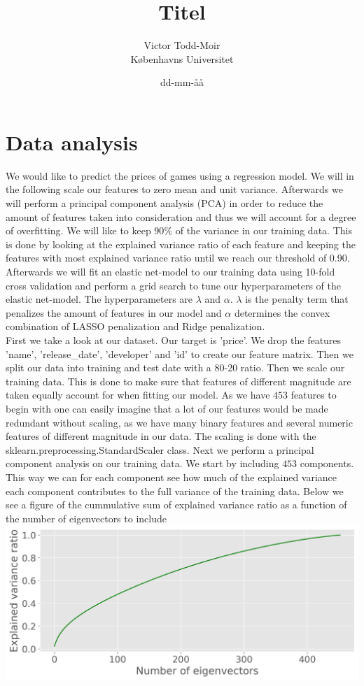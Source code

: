 \documentclass[12pt,a4paper]{article}
\author{Victor Todd-Moir\\Københavns Universitet}
\date{dd-mm-åå}
\title{Titel}
\begin{document}
	\maketitle
\section*{Data analysis}
We would like to predict the prices of games using a regression model. We will in the following scale our features to zero mean and unit variance. Afterwards we will perform a principal component analysis (PCA) in order to reduce the amount of features taken into consideration and thus we will account for a degree of overfitting. We will like to keep 90$\text{\%}$ of the variance in our training data. This is done by looking at the explained variance ratio of each feature and keeping the features with most explained variance ratio until we reach our threshold of 0.90. Afterwards we will fit an elastic net-model to our training data using 10-fold cross validation and perform a grid search to tune our hyperparameters of the elastic net-model. The hyperparameters are $\lambda$ and $\alpha$. $\lambda$ is the penalty term that penalizes the amount of features in our model and $\alpha$ determines the convex combination of LASSO penalization and Ridge penalization.\\
First we take a look at our dataset. Our target is 'price'. We drop the features 'name', 'release\_date', 'developer' and 'id' to create our feature matrix. Then we split our data into training and test date with a 80-20 ratio. Then we scale our training data. This is done to make sure that features of different magnitude are taken equally account for when fitting our model. As we have $453$ features to begin with one can easily imagine that a lot of our features would be made redundant without scaling, as we have many binary features and several numeric features of different magnitude in our data. The scaling is done with the sklearn.preprocessing.StandardScaler class. Next we perform a principal component analysis on our training data. We start by including $453$ components. This way we can for each component see how much of the explained variance each component contributes to the full variance of the training data. Below we see a figure of the cummulative sum of explained variance ratio as a function of the number of eigenvectors to include\\
\includegraphics[scale = 0.5]{cumsumEigen.png}
\end{document}

